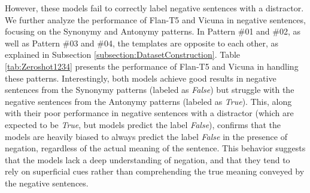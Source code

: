 \documentclass[11pt]{article}
\begin{document}
\begin{table*}[tb]
\centering
\caption{Performance of Vicuna13B and Flan-T5-xxl after fine-tuning in our dataset. The best results are highlighted in \textbf{bold}, and scores that surpass the Random baseline accuracy are \underline{underlined}.}
\label{tab:finetune}
\end{table*} 

However, these models fail to correctly label negative sentences with a distractor. We further analyze the performance of Flan-T5 and Vicuna in negative sentences, focusing on the Synonymy and Antonymy patterns. In Pattern \#01 and \#02, as well as Pattern \#03 and \#04, the templates are opposite to each other, as explained in Subsection \ref{subsection:DatasetConstruction}. Table \ref{tab:Zeroshot1234} presents the performance of Flan-T5 and Vicuna in handling these patterns. Interestingly, both models achieve good results in negative sentences from the Synonymy patterns (labeled as \textit{False}) but struggle with the negative sentences from the Antonymy patterns (labeled as \textit{True}). This, along with their poor performance in negative sentences with a distractor (which are expected to be \textit{True}, but models predict the label \textit{False}), confirms that the models are heavily biased to always predict the label \textit{False} in the presence of negation, regardless of the actual meaning of the sentence. This behavior suggests that the models lack a deep understanding of negation, and that they tend to rely on superficial cues rather than comprehending the true meaning conveyed by the negative sentences.
\end{document}
